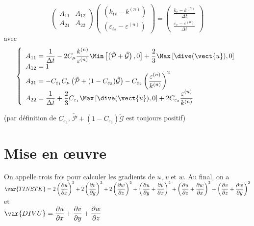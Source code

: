 \begin{equation}
\left(\begin{array}{cc}
A_{11}&A_{12}\\
A_{21}&A_{22}
\end{array}\right)
\left(\begin{array}{c}
(k_{ts}-k^{(n)})\\(\varepsilon_{ts}-\varepsilon^{(n)})
\end{array}\right)
=\left(\begin{array}{c}
\displaystyle\frac{k_e-k^{(n)}}{\Delta t}\\
\displaystyle\frac{\varepsilon_e-\varepsilon^{(n)}}{\Delta t}
\end{array}\right)
\end{equation}
avec
\begin{equation}
\left\{\begin{array}{l}
\displaystyle A_{11}=\frac{1}{\Delta t}
-2 C_\mu\frac{k^{(n)}}{\varepsilon^{(n)}}
\Min\left[\left(\tilde{\mathcal{P}}+\tilde{\mathcal{G}}\right),0\right]
+\frac{2}{3}\Max\left[\dive(\vect{u}),0\right]\\
\displaystyle A_{12}= 1\\
\displaystyle A_{21}=
- C_{\varepsilon_1} C_\mu \left(\tilde{\mathcal{P}}
+(1-C_{\varepsilon_3})\tilde{\mathcal{G}}\right)
- C_{\varepsilon_2}\left(\frac{\varepsilon^{(n)}}{k^{(n)}}\right)^2\\
\displaystyle A_{22}=\frac{1}{\Delta t}
+\frac{2}{3}C_{\varepsilon_1}\Max\left[\dive(\vect{u}),0\right]
+2 C_{\varepsilon_2}\frac{\varepsilon^{(n)}}{k^{(n)}}
\end{array}\right.
\end{equation}

(par d\'efinition de $C_{\varepsilon_3}$,
$\tilde{\mathcal{P}}+(1-C_{\varepsilon_3})\tilde{\mathcal{G}}$
est toujours positif)

\section*{Mise en \oe uvre}

On appelle trois fois  pour calculer les gradients de $u$, $v$ et
$w$. Au final, on a \\
$\displaystyle \var{TINSTK}=
2\left(\frac{\partial u}{\partial x}\right)^2+
2\left(\frac{\partial v}{\partial y}\right)^2+
2\left(\frac{\partial w}{\partial z}\right)^2+
\left(\frac{\partial u}{\partial y}+\frac{\partial v}{\partial x}\right)^2+
\left(\frac{\partial u}{\partial z}+\frac{\partial w}{\partial x}\right)^2+
\left(\frac{\partial v}{\partial z}+\frac{\partial w}{\partial y}\right)^2$\\
et\\
$\displaystyle \var{DIVU}=
\frac{\partial u}{\partial x}+\frac{\partial v}{\partial y}
+\frac{\partial w}{\partial z}$

